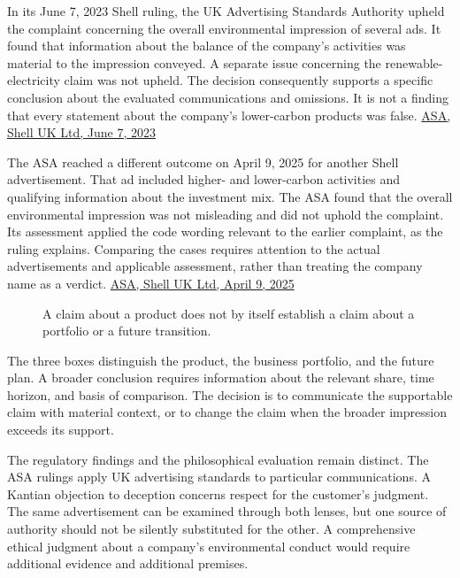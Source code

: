 In its June 7, 2023 Shell ruling, the UK Advertising Standards Authority
upheld the complaint concerning the overall environmental impression of
several ads. It found that information about the balance of the
company's activities was material to the impression conveyed. A separate
issue concerning the renewable-electricity claim was not upheld. The
decision consequently supports a specific conclusion about the evaluated
communications and omissions. It is not a finding that every statement
about the company's lower-carbon products was false.
\href{https://www.asa.org.uk/rulings/shell-uk-ltd-g22-1170842-shell-uk-ltd.html}{ASA,
Shell UK Ltd, June 7, 2023}

The ASA reached a different outcome on April 9, 2025 for another Shell
advertisement. That ad included higher- and lower-carbon activities and
qualifying information about the investment mix. The ASA found that the
overall environmental impression was not misleading and did not uphold
the complaint. Its assessment applied the code wording relevant to the
earlier complaint, as the ruling explains. Comparing the cases requires
attention to the actual advertisements and applicable assessment, rather
than treating the company name as a verdict.
\href{https://www.asa.org.uk/rulings/shell-uk-ltd-g24-1248246-shell-uk-ltd.html}{ASA,
Shell UK Ltd, April 9, 2025}

\begin{figure}[htbp]
\centering

\caption{A claim about a product does not by itself establish a claim about a portfolio or a future transition.}\label{fig:M09_environmental_scope}
\end{figure}

The three boxes distinguish the product, the business portfolio, and the
future plan. A broader conclusion requires information about the
relevant share, time horizon, and basis of comparison. The decision is
to communicate the supportable claim with material context, or to change
the claim when the broader impression exceeds its support.

The regulatory findings and the philosophical evaluation remain
distinct. The ASA rulings apply UK advertising standards to particular
communications. A Kantian objection to deception concerns respect for
the customer's judgment. The same advertisement can be examined through
both lenses, but one source of authority should not be silently
substituted for the other. A comprehensive ethical judgment about a
company's environmental conduct would require additional evidence and
additional premises.

